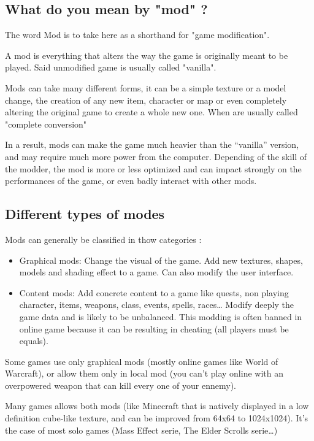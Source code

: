 \documentclass[a4paper,11pt]{article}
\begin{document}
\subsection{What do you mean by "mod" ?}

The word Mod is to take here as a shorthand for "game modification".

A mod is everything that alters the way the game is originally meant to be played. Said unmodified game is usually called "vanilla".

Mods can take many different forms, it can be a simple texture or a model change, the creation of any new item, character or map or even completely altering the original game to create a whole new one. When  are usually called "complete conversion"

In a result, mods can make the game much heavier than the “vanilla” version, and may require much more power from the computer. Depending of the skill of the modder, the mod is more or less optimized and can impact strongly on the performances of the game, or even badly interact with other mods.

\subsection{Different types of modes}

Mods can generally be classified in thow categories :

\begin{itemize}
\item Graphical mods: Change the visual of the game. Add new textures, shapes, models and shading effect to a game. Can also modify the user interface.
\item Content mods: Add concrete content to a game like quests, non playing character, items, weapons, class, events, spells, races… Modify deeply the game data and is likely to be unbalanced. This modding is often banned in online game because it can be resulting in cheating (all players must be equals).
\end{itemize}

Some games use only graphical mods (mostly online games like World of Warcraft), or allow them only in local mod (you can’t play online with an overpowered weapon that can kill every one of your ennemy).

Many games allows both mods (like Minecraft that is natively displayed in a low definition cube-like texture, and can be improved from 64x64 to 1024x1024). It’s the case of most solo games (Mass Effect serie, The Elder Scrolls serie…)
\end{document}
